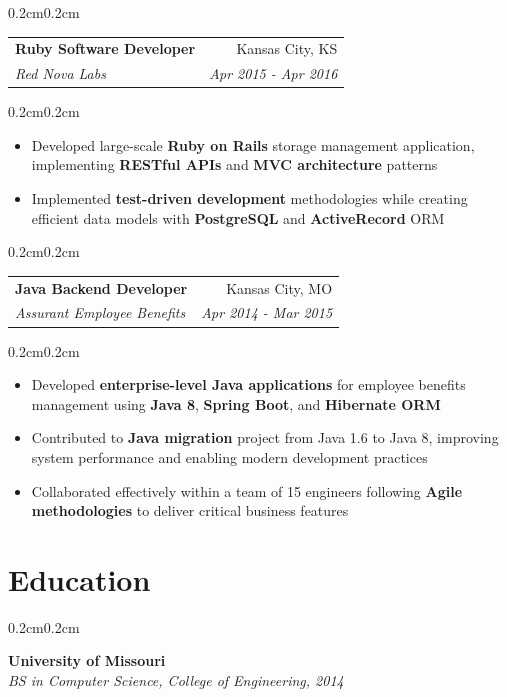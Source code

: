 \documentclass[10pt, letterpaper]{article}
\makeatletter
\newenvironment{highlights}{
    \begin{itemize}[
        topsep=0.10 cm,
        parsep=0.10 cm,
        partopsep=0pt,
        itemsep=0pt,
        leftmargin=0.4 cm + 10pt
    ]
}{
    \end{itemize}
}
\newenvironment{onecolentry}{
    \begin{adjustwidth}{0.2cm}{0.2cm}
}{
    \end{adjustwidth}
}
\newcommand{\jobentry}[4]{
    \begin{onecolentry}
        \noindent
        \begin{tabularx}{\textwidth}{@{}X r@{}}
            \textbf{#1} & #4\\
            \textit{#2} & \textit{#3}
        \end{tabularx}
        \vspace{0.05cm}
    \end{onecolentry}
}
\newcommand{\educationentry}[2]{
    \begin{onecolentry}
        \noindent
        \textbf{#1}\\
        \textit{#2}
    \end{onecolentry}
}
\makeatother
\begin{document}
    \vspace{0.3cm}

    \jobentry{Ruby Software Developer}{Red Nova Labs}{Apr 2015 - Apr 2016}{Kansas City, KS}

    \vspace{0.10cm}
    \begin{onecolentry}
        \begin{highlights}
            \item Developed large-scale \textbf{Ruby on Rails} storage management application, implementing \textbf{RESTful APIs} and \textbf{MVC architecture} patterns
            \item Implemented \textbf{test-driven development} methodologies while creating efficient data models with \textbf{PostgreSQL} and \textbf{ActiveRecord} ORM
        \end{highlights}
    \end{onecolentry}

    \vspace{0.3cm}
    \jobentry{Java Backend Developer}{Assurant Employee Benefits}{Apr 2014 - Mar 2015}{Kansas City, MO}

    \vspace{0.10cm}
    \begin{onecolentry}
        \begin{highlights}
            \item Developed \textbf{enterprise-level Java applications} for employee benefits management using \textbf{Java 8}, \textbf{Spring Boot}, and \textbf{Hibernate ORM}
            \item Contributed to \textbf{Java migration} project from Java 1.6 to Java 8, improving system performance and enabling modern development practices
            \item Collaborated effectively within a team of 15 engineers following \textbf{Agile methodologies} to deliver critical business features
        \end{highlights}
    \end{onecolentry}

    \section{Education}
    \educationentry{University of Missouri}{BS in Computer Science, College of Engineering, 2014}
\end{document}
